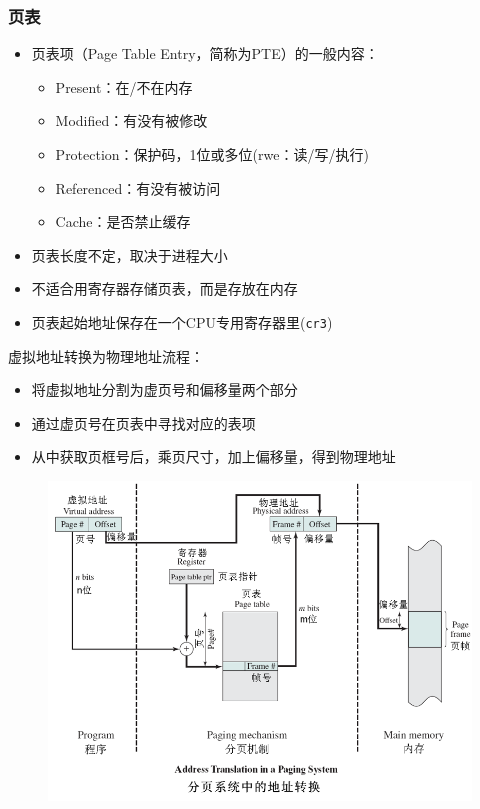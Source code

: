 \subsubsection{页表}
\begin{itemize}
\item 页表项（Page Table Entry，简称为PTE）的一般内容：
\begin{itemize}
\item Present：在/不在内存
\item Modified：有没有被修改
\item Protection：保护码，1位或多位(rwe：读/写/执行)
\item Referenced：有没有被访问
\item Cache：是否禁止缓存
\end{itemize}
\item 页表长度不定，取决于进程大小
\item 不适合用寄存器存储页表，而是存放在内存
\item 页表起始地址保存在一个CPU专用寄存器里(\verb'cr3')
\end{itemize}

虚拟地址转换为物理地址流程：
\begin{itemize}
    \item 将虚拟地址分割为虚页号和偏移量两个部分
    \item 通过虚页号在页表中寻找对应的表项
    \item 从中获取页框号后，乘页尺寸，加上偏移量，得到物理地址
\end{itemize}

\begin{figure}[H]
    \centering
    \includegraphics[width=0.6\linewidth]{fig/memory_address_transformation.png}
\end{figure}

